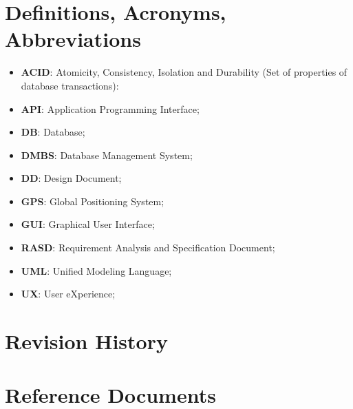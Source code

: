 \section{Definitions, Acronyms, Abbreviations}
\begin{itemize}
  \setlength{\itemindent}{-.4in}
  \item[] \textbf{ACID}: Atomicity, Consistency, Isolation and Durability (Set of properties of database transactions):
  \item[] \textbf{API}: Application Programming Interface;
  \item[] \textbf{DB}: Database;
  \item[] \textbf{DMBS}: Database Management System;
  \item[] \textbf{DD}: Design Document;
  \item[] \textbf{GPS}: Global Positioning System;
  \item[] \textbf{GUI}: Graphical User Interface;
  \item[] \textbf{RASD}: Requirement Analysis and Specification Document;
  \item[] \textbf{UML}: Unified Modeling Language;
  \item[] \textbf{UX}: User eXperience;
\end{itemize}
\section{Revision History}

\section{Reference Documents}

